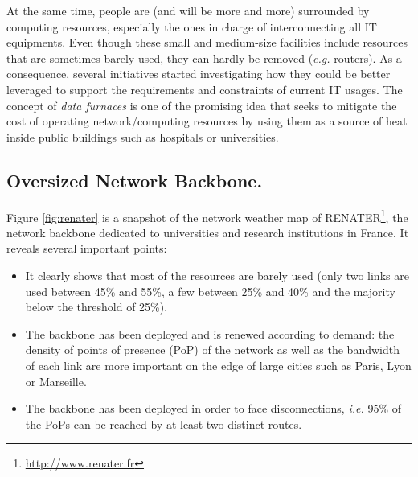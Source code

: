 At the same time, people are (and will be more and more) surrounded by
computing resources, especially the ones in charge of interconnecting all IT
equipments.  Even though these small and medium-size facilities include
resources that are sometimes barely used, they can hardly be removed (\textit{e.g.} routers). As
a consequence, several initiatives started investigating how they could be
better leveraged to support the requirements and constraints of current IT
usages.  The concept of \emph{data furnaces} \cite{liu:hotcloud11} is one of
the promising idea that seeks to mitigate the cost of operating
network/computing resources by using them as a source of heat inside public
buildings such as hospitals or universities. 


\subsection{Oversized Network Backbone.}
Figure \ref{fig:renater} is a snapshot of the network weather
map of RENATER\footnote{\href{http://www.renater.fr}{http://www.renater.fr}}, the network backbone dedicated to universities and research
institutions in France. It reveals several important points: 
\begin{itemize} 
\item It clearly shows that most of the resources are barely used (only two links are used between 45\% and 55\%, a few between 25\% and 40\% and the majority below the threshold of 25\%). 
\item The backbone has been deployed and is renewed according to demand: the density of
points of presence (PoP) of the network as well as the bandwidth of each link are more important on the edge of large cities such as Paris, Lyon or
Marseille. 
\item The backbone has been deployed in order to face disconnections, \textit{i.e.} 95\% of the PoPs can be reached by at least two distinct routes.
\end{itemize}


